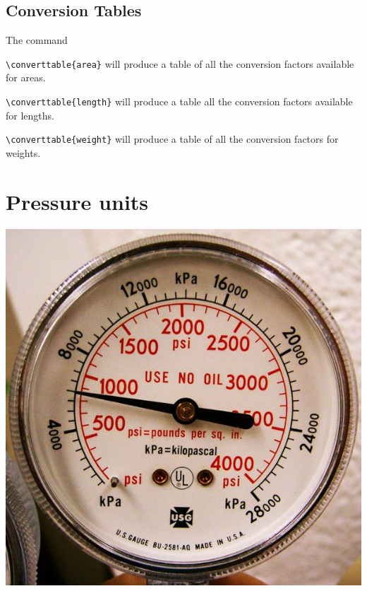 \documentclass{tufte-book}
\begin{document}
\section{Conversion Tables}

The command

\begin{description}

\item \verb+\converttable{area}+ will produce a table of all the conversion factors available for areas.

\item \verb+\converttable{length}+ will produce a table all the conversion factors available for lengths. 

\item \verb+\converttable{weight}+ will produce a table of all the conversion factors for weights.

\end{description}



%
%
%
%
%
%
%

\chapter{Pressure units}
\begin{marginfigure}
\includegraphics[width=\linewidth]{./graphics/pressuregauge}
\end{marginfigure}
\end{document}
